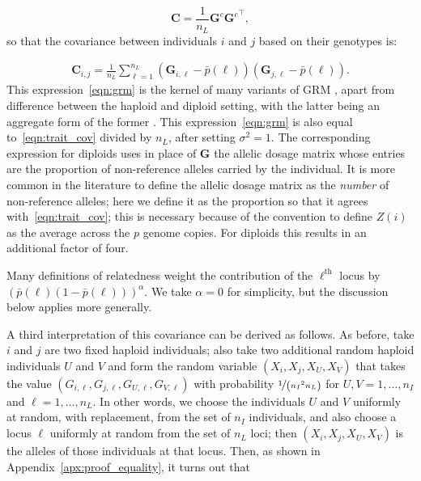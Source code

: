 % 
\[ \mathbf{C} = \frac{1}{n_L}\mathbf{G}^c{\mathbf{G}^c}^\intercal, \]
%
so that the covariance between individuals $i$ and $j$ based on their genotypes is:

%
\begin{align} \label{eqn:grm}
    \mathbf{C}_{i,j} = \frac{1}{n_L} \sum_{\ell=1}^{n_L} (\mathbf{G}_{i,\ell} - \bar{p}(\ell))(\mathbf{G}_{j,\ell} - \bar{p}(\ell)).
\end{align}
%
This expression~\eqref{eqn:grm} is the kernel of many variants of GRM
\citep{vanraden2008efficient, yang2010common, speed2015relatedness, zhang2023biobank},
apart from difference between the haploid and diploid setting,
with the latter being an aggregate form of the former
\citep{cockerham1976group, smith1985efficient}.
%
This expression~\eqref{eqn:grm} is also equal to~\eqref{eqn:trait_cov}
divided by $n_L$, after setting $\sigma^2=1$.
%
The corresponding expression for diploids uses
in place of $\mathbf{G}$ the allelic dosage matrix
whose entries are the proportion of non-reference alleles carried by the individual.
It is more common in the literature to define the allelic dosage matrix
as the \emph{number} of non-reference alleles;
here we define it as the proportion so that it agrees with~\eqref{eqn:trait_cov};
this is necessary because 
of the convention to define $Z(i)$ as the average across the $p$ genome copies.
For diploids this results in an additional factor of four.

Many definitions of relatedness weight the contribution of the $\ell^\text{th}$ locus
by $(\bar p(\ell) (1 - \bar{p}(\ell)))^\alpha$.
We take $\alpha=0$ for simplicity,
but the discussion below applies more generally.


A third interpretation of this covariance can be derived as follows.
%
As before, take $i$ and $j$ are two fixed haploid individuals;
also take two additional random haploid individuals $U$ and $V$ 
and form the random variable $(X_i, X_j, X_U, X_V)$
that takes the value $(G_{i,\ell}, G_{j,\ell}, G_{U,\ell}, G_{V,\ell})$
with probability $\nicefrac{1}{\left({n_I}^2 n_L\right)}$
for $U, V = 1, \dots, n_I$ and $\ell = 1, \dots, n_L$.
%
In other words, we choose the individuals $U$ and $V$ uniformly at
random, with replacement, from the set of $n_I$ individuals, and
also choose a locus $\ell$ uniformly at random from the set of $n_L$ loci;
then $(X_i, X_j, X_U, X_V)$ is the alleles of those individuals at that locus.
%
Then, as shown in Appendix~\ref{apx:proof_equality},
it turns out that

